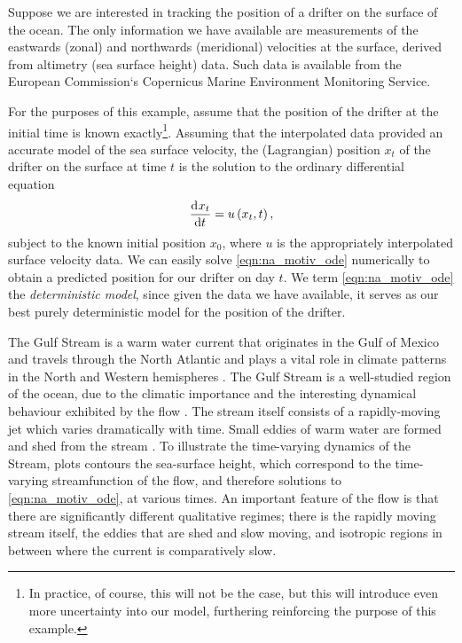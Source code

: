 Suppose we are interested in tracking the position of a drifter on the surface of the ocean.
The only information we have available are measurements of the eastwards (zonal) and northwards (meridional) velocities at the surface, derived from altimetry (sea surface height) data.
Such data is available from the European Commission`s Copernicus Marine Environment Monitoring Service.

For the purposes of this example, assume that the position of the drifter at the initial time is known exactly\footnote{In practice, of course, this will not be the case, but this will introduce even more uncertainty into our model, furthering reinforcing the purpose of this example.}.
Assuming that the interpolated data provided an accurate model of the sea surface velocity, the (Lagrangian) position \(x_t\) of the drifter on the surface at time \(t\) is the solution to the ordinary differential equation
\begin{equation}\label{eqn:na_motiv_ode}
	\dod{x_t}{t} = u\left(x_t, t\right),
\end{equation}
subject to the known initial position \(x_0\), where \(u\) is the appropriately interpolated surface velocity data.
We can easily solve \eqref{eqn:na_motiv_ode} numerically to obtain a predicted position for our drifter on day \(t\).
We term \eqref{eqn:na_motiv_ode} the \emph{deterministic model}, since given the data we have available, it serves as our best purely deterministic model for the position of the drifter.


The Gulf Stream is a warm water current that originates in the Gulf of Mexico and travels through the North Atlantic and plays a vital role in climate patterns in the North and Western hemispheres \citep{Palter_2015_RoleGulfStream}.
The Gulf Stream is a well-studied region of the ocean, due to the climatic importance and the interesting dynamical behaviour exhibited by the flow \citep{LiuEtAl_2018_GulfStreamTransport,another?}.
The stream itself consists of a rapidly-moving jet which varies dramatically with time.
Small eddies of warm water are formed and shed from the stream \citep{KangCurchitser_2013_GulfStreamEddy}.
To illustrate the time-varying dynamics of the Stream,  plots contours the sea-surface height, which correspond to the time-varying streamfunction of the flow, and therefore solutions to \eqref{eqn:na_motiv_ode}, at various times.
An important feature of the flow is that there are significantly different qualitative regimes; there is the rapidly moving stream itself, the eddies that are shed and slow moving, and isotropic regions in between where the current is comparatively slow.

